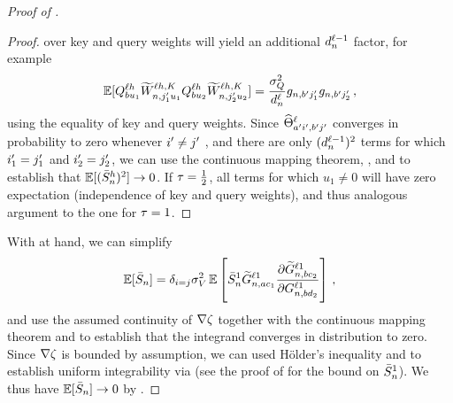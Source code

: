 \begin{proof}[Proof of ]
\begin{proof}
        over key and query weights will yield an additional $d_{n}^{\ell - 1}$ factor,
        for example
        $$
            \operatorname*{\mathbb{E}} [
                Q_{b u_1}^{\ell h}
                \widetilde{W}_{n, j'_1 u_1}^{\ell h , K}
                Q_{b u_2}^{\ell h}
                \widetilde{W}_{n, j'_2 u_2}^{\ell h , K}
            ]
            =
            \frac{\sigma_{Q}^2}{d_{n}^{\ell}}
            g_{n, b' j'_1}
            g_{n, b' j'_2}
            \, ,
        $$
        using the equality of key and query weights.
        Since $\widehat{\Theta}_{a' i', b' j'}^{\ell}$ converges in probability to zero whenever $i' \neq j'$ \citep{yang2019v2}, and there are only $(d_{n}^{\ell - 1})^2$ terms for which $i'_1 = j'_1$ and $i'_2 = j'_2$, we can use the continuous mapping theorem, , and  to establish that $\operatorname*{\mathbb{E}} [ (\bar{S}_{n}^{h})^2 ] \to 0$.
        If $\tau = \frac{1}{2}$, all terms for which $u_1 \neq 0$ will have zero expectation (independence of key and query weights), and thus analogous argument to the one for $\tau = 1$.
    \end{proof}
    
    With  at hand, we can simplify
    \begin{align*}
        \operatorname*{\mathbb{E}} [\bar{S}_n]
        =
        \delta_{i = j}
        \sigma_{V}^2
        \operatorname*{\mathbb{E}} \left[
            \bar{S}_{n}^1
            \widetilde{G}_{n, a c_1}^{\ell 1}
            \frac{
                \partial
                \widetilde{G}_{n, b c_2}^{\ell 1}
            }{
                \partial 
                G_{n, b d_2}^{\ell 1}
            }
        \right]
        \, ,
    \end{align*}
    and use the assumed continuity of $\nabla \zeta$ together with the continuous mapping theorem and  to establish that the integrand converges in distribution to zero.
    Since $\nabla \zeta$ is bounded by assumption, we can used H{\" o}lder's inequality and  to establish uniform integrability via  (see the proof of  for the bound on $\bar{S}_n^1$).
    We thus have $\operatorname*{\mathbb{E}} [\bar{S}_n] \to 0$
    by .
    

\end{proof}
